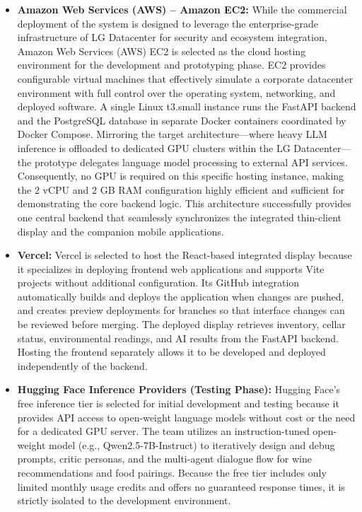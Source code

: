 \documentclass[conference]{IEEEtran}
\begin{document}
\begin{itemize}
    \item \textbf{Amazon Web Services (AWS) -- Amazon EC2:} While the commercial deployment of the system is designed to leverage the enterprise-grade infrastructure of LG Datacenter for security and ecosystem integration, Amazon Web Services (AWS) EC2 is selected as the cloud hosting environment for the development and prototyping phase. EC2 provides configurable virtual machines that effectively simulate a corporate datacenter environment with full control over the operating system, networking, and deployed software. A single Linux t3.small instance runs the FastAPI backend and the PostgreSQL database in separate Docker containers coordinated by Docker Compose. Mirroring the target architecture---where heavy LLM inference is offloaded to dedicated GPU clusters within the LG Datacenter---the prototype delegates language model processing to external API services. Consequently, no GPU is required on this specific hosting instance, making the 2 vCPU and 2 GB RAM configuration highly efficient and sufficient for demonstrating the core backend logic. This architecture successfully provides one central backend that seamlessly synchronizes the integrated thin-client display and the companion mobile applications.
    \item \textbf{Vercel:} Vercel is selected to host the React-based integrated display because it specializes in deploying frontend web applications and supports Vite projects without additional configuration. Its GitHub integration automatically builds and deploys the application when changes are pushed, and creates preview deployments for branches so that interface changes can be reviewed before merging. The deployed display retrieves inventory, cellar status, environmental readings, and AI results from the FastAPI backend. Hosting the frontend separately allows it to be developed and deployed independently of the backend.
    \item \textbf{Hugging Face Inference Providers (Testing Phase):} Hugging Face's free inference tier is selected for initial development and testing because it provides API access to open-weight language models without cost or the need for a dedicated GPU server. The team utilizes an instruction-tuned open-weight model (e.g., Qwen2.5-7B-Instruct) to iteratively design and debug prompts, critic personas, and the multi-agent dialogue flow for wine recommendations and food pairings. Because the free tier includes only limited monthly usage credits and offers no guaranteed response times, it is strictly isolated to the development environment.

\end{itemize}
\end{document}
